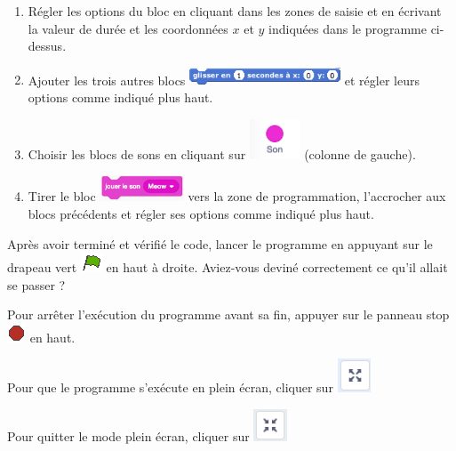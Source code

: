 \begin{enumerate}
\item Régler les options du bloc en cliquant dans les zones de saisie et en écrivant la valeur de durée et les coordonnées $x$ et $y$ indiquées dans le programme ci-dessus.
\item Ajouter les trois autres blocs \includegraphics[width=4.5cm]{./images/scratch/BlocGlisser} et régler leurs options comme indiqué plus haut.
\item Choisir les blocs de sons en cliquant sur \includegraphics[width=1.5cm]{./images/scratch/son.png} (colonne de gauche).
\item Tirer le bloc \includegraphics[width=2.5cm]{./images/scratch/meow.png} vers la zone de programmation, l'accrocher aux blocs précédents et régler ses options comme indiqué plus haut.
\end{enumerate}

\vspace{12pt}

Après avoir terminé et vérifié le code, lancer le programme en appuyant sur le drapeau vert \includegraphics[width=.7cm]{./images/scratch/DrapeauVert} en haut à droite. Aviez-vous deviné correctement ce qu'il allait se passer ?

Pour arrêter l'exécution du programme avant sa fin, appuyer sur le panneau stop \includegraphics[width=.7cm]{./images/scratch/Stop} en haut.

Pour que le programme s'exécute en plein écran, cliquer sur \includegraphics[width=1cm]{./images/scratch/pleinEcran.png}

Pour quitter le mode plein écran, cliquer sur \includegraphics[width=1cm]{./images/scratch/quitterPleinEcran.png}








